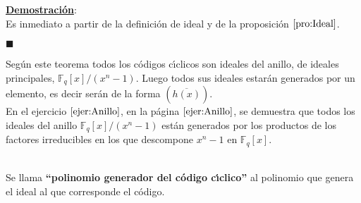 \underline{\textbf{Demostraci\'on}}:\\
Es inmediato a partir de la definici\'on de ideal y de la proposici\'on
$\ref{pro:Ideal}$.
\begin{flushright}
$\blacksquare$
\end{flushright}
Seg\'un este teorema todos los c\'odigos c\'{\i}clicos son ideales del anillo,
de ideales principales, $\mathbb{F}_q[x]/(x^n-1)$. Luego todos
sus ideales estar\'an generados por un elemento, es decir ser\'an de la forma
$(\overline{h(x)})$.\\

En el ejercicio $\ref{ejer:Anillo}$, en la p\'agina $\pageref{ejer:Anillo}$, se
demuestra que todos los ideales del anillo $\mathbb{F}_q[x]/(x^n-1)$ est\'an
generados por los productos de los factores irreducibles en los que descompone
$x^n-1$ en $\mathbb{F}_q[x]$.
%
\begin{definicion}
\ \\
Se llama \textbf{``polinomio generador del c\'odigo c\'{\i}clico''} al
polinomio que genera el ideal al que corresponde el c\'odigo.
\end{definicion}
